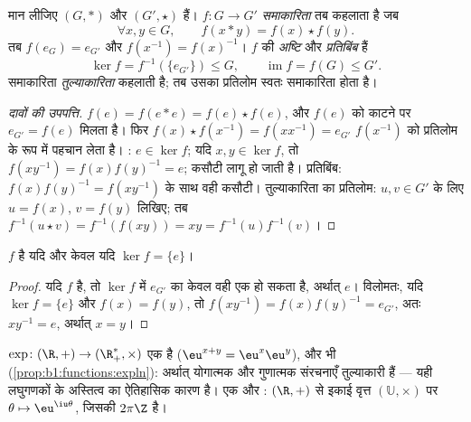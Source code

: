 \begin{definition}[समूह समाकारिता]\label{def:b1:structures:morphism}
मान लीजिए $(G, *)$ और $(G', \star)$  हैं।  $f \colon G \to
G'$ \emph{समाकारिता} तब कहलाता है जब
\[
\forall x, y \in G, \qquad f(x * y) = f(x) \star f(y).
\]
तब $f(e_G) = e_{G'}$ और $f(x^{-1}) = f(x)^{-1}$। $f$ की
\emph{अष्टि} और \emph{प्रतिबिंब} हैं
\[
\ker f = f^{-1}(\{e_{G'}\}) \leq G,
\qquad
\operatorname{im} f = f(G) \leq G' .
\]
 समाकारिता \emph{तुल्याकारिता} कहलाती है; तब उसका प्रतिलोम
 स्वतः समाकारिता होता है।
\end{definition}

\begin{proof}[दावों की उपपत्ति]
$f(e) = f(e * e) = f(e)\star f(e)$, और $f(e)$ को काटने पर $e_{G'} = f(e)$
मिलता है। फिर $f(x)\star f(x^{-1}) = f(x x^{-1}) = e_{G'}$ $f(x^{-1})$ को
प्रतिलोम के रूप में पहचान लेता है। : $e \in \ker f$; यदि $x, y \in \ker
f$, तो $f(xy^{-1}) = f(x)f(y)^{-1} = e$; कसौटी लागू हो जाती है। प्रतिबिंब:
$f(x)f(y)^{-1} = f(xy^{-1})$ के साथ वही कसौटी। तुल्याकारिता का प्रतिलोम: $u,
v \in G'$ के लिए $u = f(x)$, $v = f(y)$ लिखिए; तब $f^{-1}(u \star v) =
f^{-1}(f(xy)) = xy = f^{-1}(u) f^{-1}(v)$।
\end{proof}

\begin{proposition}[अष्टि के द्वारा एकैकीयता]\label{prop:b1:structures:kernel}
  $f$  है यदि और केवल यदि $\ker f = \{e\}$।
\end{proposition}

\begin{proof}
यदि $f$  है, तो $\ker f$ में $e_{G'}$ का केवल वही एक  हो
सकता है, अर्थात् $e$। विलोमतः, यदि $\ker f = \{e\}$ और $f(x) = f(y)$, तो
$f(xy^{-1}) = f(x) f(y)^{-1} = e_{G'}$, अतः $xy^{-1} = e$, अर्थात् $x = y$।
\end{proof}

\begin{example}\label{ex:b1:structures:expmorphism}
$\exp \colon (\R, +) \to (\R_+^*, \times)$ एक  है ($\eu^{x+y} =
\eu^x \eu^y$), और  भी (\cref{prop:b1:functions:expln}): अर्थात्
योगात्मक और गुणात्मक संरचनाएँ तुल्याकारी हैं --- यही लघुगणकों के अस्तित्व का
ऐतिहासिक कारण है। एक और : $(\R, +)$ से इकाई वृत्त $(\mathbb{U},
\times)$ पर $\theta \mapsto \eu^{\iu\theta}$, जिसकी  $2\pi\Z$ है।
\end{example}

